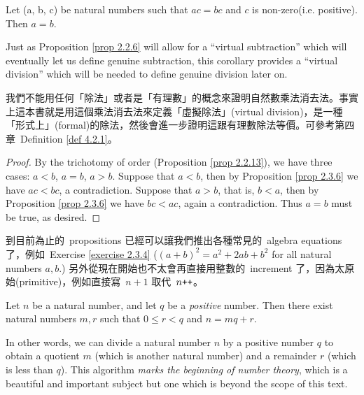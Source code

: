 \begin{corollary} \label{corollary 2.3.7}
Let (a, b, c) be natural numbers such that \(ac = bc\) and \(c\) is non-zero(i.e. positive). Then \(a = b\).
\end{corollary}

\begin{remark} \label{remark 2.3.8}
Just as Proposition \ref{prop 2.2.6} will allow for a “virtual subtraction” which will eventually let us define genuine subtraction, this corollary provides a “virtual division” which will be needed to define genuine division later on.
\end{remark}
\begin{note}
我們不能用任何「除法」或者是「有理數」的概念來證明自然數乘法消去法。事實上這本書就是用這個乘法消去法來定義「虛擬除法」(virtual division)，是一種「形式上」(formal)的除法，然後會進一步證明這跟有理數除法等價。可參考第四章\ Definition \ref{def 4.2.1}。
\end{note}
\begin{proof}
By the trichotomy of order (Proposition \ref{prop 2.2.13}), we have three cases: \(a < b\), \(a = b\), \(a > b\). Suppose that \(a < b\), then by Proposition \ref{prop 2.3.6} we have \(ac < bc\), a contradiction. Suppose that \(a > b\), that is, \(b < a\), then by Proposition \ref{prop 2.3.6} we have \(bc < ac\), again a contradiction. Thus \(a = b\) must be true, as desired.
\end{proof}

\begin{note}
到目前為止的\ propositions 已經可以讓我們推出各種常見的\ algebra equations 了，例如\ Exercise \ref{exercise 2.3.4} (\((a + b)^2 = a^2 +2ab + b^2\) for all natural numbers \(a, b\).) 另外從現在開始也不太會再直接用整數的\ increment 了，因為太原始(primitive)，例如直接寫\ \(n + 1\) 取代\ \(n\texttt{++}\)。
\end{note}

\begin{proposition} \label{prop 2.3.9}
Let \(n\) be a natural number, and let \(q\) be a \emph{positive} number. Then there exist natural numbers \(m, r\) such that \(0 \leq r < q\) and \(n = mq + r\).
\end{proposition}

\begin{remark} \label{remark 2.3.10}
In other words, we can divide a natural number \(n\) by a positive number \(q\) to obtain a quotient \(m\) (which is another natural number) and a remainder \(r\) (which is less than \(q\)). This algorithm \emph{marks the beginning of number theory}, which is a beautiful and important subject but one which is beyond the scope of this text.
\end{remark}

